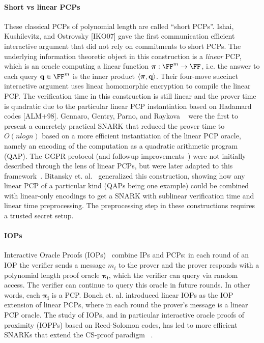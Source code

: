 \paragraph{Short vs linear PCPs} These classical PCPs of polynomial length are called ``short PCPs''. Ishai, Kushilevitz, and Ostrovsky [IKO07] gave the first communication efficient interactive argument that did not rely on commitments to short PCPs. The underlying information theoretic object in this construction is a \emph{linear} PCP, which is an oracle computing a linear function $\proofO: \FF^m \rightarrow \FF$, i.e. the answer to each query $\mathbf{q} \in \FF^m$ is the inner product $\langle \boldsymbol{\pi}, \mathbf{q} \rangle$. Their four-move succinct interactive argument uses linear homomorphic encryption to compile the linear PCP. The verification time in this construction is still linear and the prover time is quadratic due to the particular linear PCP instantiation based on Hadamard codes [ALM+98]. Gennaro, Gentry, Parno, and Raykova ~\cite{GGPR} were the first to present a concretely practical SNARK that reduced the prover time to $O(n log n)$ based on a more efficient instantiation of the linear PCP oracle, namely an encoding of the computation as a quadratic arithmetic program (QAP). The GGPR protocol (and followup improvements~\cite{Pinocchio}) were not initially described through the lens of linear PCPs, but were later adapted to this framework~\cite{TCC:BCIOP13, Setty}. Bitansky et. al.~\cite{TCC:BCIOP13} generalized this construction, showing how any linear PCP of a particular kind (QAPs being one example) could be combined with linear-only encodings to get a SNARK with sublinear verification time and linear time preprocessing. The preprocessing step in these constructions requires a trusted secret setup. 

\paragraph{IOPs} Interactive Oracle Proofs (IOPs)~\cite{TCC:BenChiSpo16, STOC:ReiRotRot16} combine IPs and PCPs: in each round of an IOP the verifier sends a message $m_i$ to the prover and the prover responds with a polynomial length proof oracle $\boldsymbol{\pi_i}$, which the verifier can query via random access. The verifier can continue to query this oracle in future rounds. In other words, each $\boldsymbol{\pi_i}$ is a PCP. Boneh et. al. \cite{C:BBCGI19} introduced linear IOPs as the IOP extension of linear PCPs, where in each round the prover's message is a linear PCP oracle. The study of IOPs, and in particular interactive oracle proofs of proximity (IOPPs) based on Reed-Solomon codes, has led to more efficient SNARKs that extend the CS-proof paradigm ~\cite{ICALP:BBHR18}.

